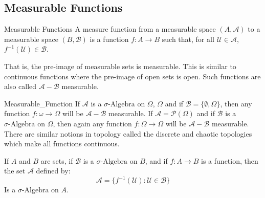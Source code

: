     \subsection{Measurable Functions}
        \begin{ldefinition}{Measurable Functions}
            A measure function from a measurable space
            $(A,\mathcal{A})$ to a measurable space
            $(B,\mathcal{B})$ is a function $f:A\rightarrow{B}$
            such that, for all $\mathcal{U}\in\mathcal{A}$,
            $f^{-1}(\mathcal{U})\in\mathcal{B}$.
        \end{ldefinition}
        That is, the pre-image of measurable sets is measurable.
        This is similar to continuous functions where the pre-image
        of open sets is open. Such functions are also called
        $\mathcal{A}-\mathcal{B}$ measurable.
        \begin{lexample}{}{Measurable_Function}
            If $\mathcal{A}$ is a $\sigma\text{-Algebra}$ on $\Omega$,
            $\Omega$ and if $\mathcal{B}=\{\emptyset,\Omega\}$,
            then any function $f:\omega\rightarrow\Omega$ will be
            $\mathcal{A}-\mathcal{B}$ measurable. If
            $\mathcal{A}=\mathcal{P}(\Omega)$ and if
            $\mathcal{B}$ is a $\sigma\text{-Algebra}$ on $\Omega$,
            then again any function $f:\Omega\rightarrow\Omega$ will
            be $\mathcal{A}-\mathcal{B}$ measurable. There are similar
            notions in topology called the discrete and chaotic
            topologies which make all functions continuous.
        \end{lexample}
        \begin{theorem}
            If $A$ and $B$ are sets, if $\mathcal{B}$ is a
            $\sigma\text{-Algebra}$ on $B$, and if $f:A\rightarrow{B}$
            is a function, then the set $\mathcal{A}$ defined by:
            \begin{equation}
                \mathcal{A}=
                \{f^{-1}(\mathcal{U}):\mathcal{U}\in\mathcal{B}\}
            \end{equation}
            Is a $\sigma\text{-Algebra}$ on $A$.
        \end{theorem}
